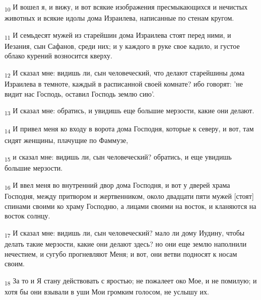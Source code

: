 \begin{tcolorbox}
\textsubscript{10} И вошел я, и вижу, и вот всякие изображения пресмыкающихся и нечистых животных и всякие идолы дома Израилева, написанные по стенам кругом.
\end{tcolorbox}
\begin{tcolorbox}
\textsubscript{11} И семьдесят мужей из старейшин дома Израилева стоят перед ними, и Иезания, сын Сафанов, среди них; и у каждого в руке свое кадило, и густое облако курений возносится кверху.
\end{tcolorbox}
\begin{tcolorbox}
\textsubscript{12} И сказал мне: видишь ли, сын человеческий, что делают старейшины дома Израилева в темноте, каждый в расписанной своей комнате? ибо говорят: 'не видит нас Господь, оставил Господь землю сию'.
\end{tcolorbox}
\begin{tcolorbox}
\textsubscript{13} И сказал мне: обратись, и увидишь еще большие мерзости, какие они делают.
\end{tcolorbox}
\begin{tcolorbox}
\textsubscript{14} И привел меня ко входу в ворота дома Господня, которые к северу, и вот, там сидят женщины, плачущие по Фаммузе,
\end{tcolorbox}
\begin{tcolorbox}
\textsubscript{15} и сказал мне: видишь ли, сын человеческий? обратись, и еще увидишь большие мерзости.
\end{tcolorbox}
\begin{tcolorbox}
\textsubscript{16} И ввел меня во внутренний двор дома Господня, и вот у дверей храма Господня, между притвором и жертвенником, около двадцати пяти мужей [стоят] спинами своими ко храму Господню, а лицами своими на восток, и кланяются на восток солнцу.
\end{tcolorbox}
\begin{tcolorbox}
\textsubscript{17} И сказал мне: видишь ли, сын человеческий? мало ли дому Иудину, чтобы делать такие мерзости, какие они делают здесь? но они еще землю наполнили нечестием, и сугубо прогневляют Меня; и вот, они ветви подносят к носам своим.
\end{tcolorbox}
\begin{tcolorbox}
\textsubscript{18} За то и Я стану действовать с яростью; не пожалеет око Мое, и не помилую; и хотя бы они взывали в уши Мои громким голосом, не услышу их.
\end{tcolorbox}
